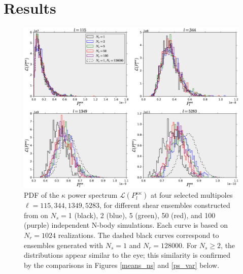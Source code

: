 \documentclass[reprint,aps,prd,superscriptaddress,showkeys,showpacs]{revtex4-1}
\begin{document}

\section{Results} 


\begin{figure}
\includegraphics[scale=0.4]{Figures/ps_pdf.eps}
\caption{PDF of the $\kappa$ power spectrum
  $\mathcal{L}(P_l^{\kappa\kappa})$ at four selected multipoles
  $\ell=115,344,1349,5283$, for different shear ensembles constructed
  from on $N_s=$1 (black), 2 (blue), 5 (green), 50 (red), and 100
  (purple) independent N-body simulations. Each curve is based on
  $N_r=1024$ realizations.  The dashed black curves correspond to
  ensembles generated with $N_s=1$ and $N_r=128000$. For $N_s\geq2$,
  the distributions appear similar to the eye; this similarity is
  confirmed by the comparisons in Figures \ref{means_ns} and
  \ref{ps_var} below.}
\label{ps_pdf}
\end{figure}
\end{document}
